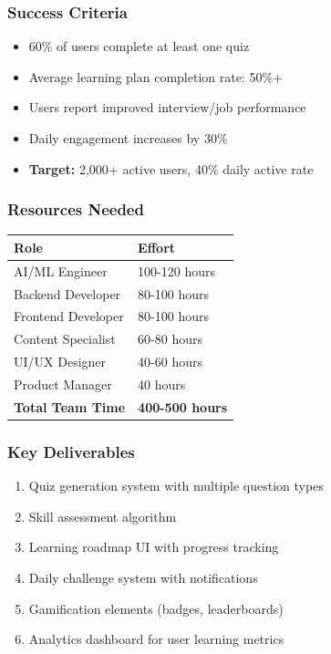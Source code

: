 \documentclass[12pt,a4paper]{article}
\begin{document}
\subsubsection{Success Criteria}

\begin{itemize}
    \item 60\% of users complete at least one quiz
    \item Average learning plan completion rate: 50\%+
    \item Users report improved interview/job performance
    \item Daily engagement increases by 30\%
    \item \textbf{Target:} 2,000+ active users, 40\% daily active rate
\end{itemize}

\subsubsection{Resources Needed}

\begin{table}[h]
\centering
\begin{tabular}{|l|l|}
\hline
\textbf{Role} & \textbf{Effort} \\
\hline
AI/ML Engineer & 100-120 hours \\
\hline
Backend Developer & 80-100 hours \\
\hline
Frontend Developer & 80-100 hours \\
\hline
Content Specialist & 60-80 hours \\
\hline
UI/UX Designer & 40-60 hours \\
\hline
Product Manager & 40 hours \\
\hline
\textbf{Total Team Time} & \textbf{400-500 hours} \\
\hline
\end{tabular}
\end{table}

\subsubsection{Key Deliverables}

\begin{enumerate}
    \item Quiz generation system with multiple question types
    \item Skill assessment algorithm
    \item Learning roadmap UI with progress tracking
    \item Daily challenge system with notifications
    \item Gamification elements (badges, leaderboards)
    \item Analytics dashboard for user learning metrics
\end{enumerate}
\end{document}
